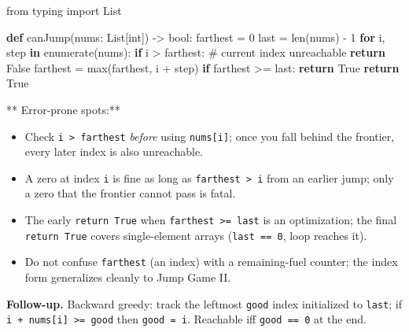 \documentclass[11pt]{article}
\providecommand{\tightlist}{\setlength{\itemsep}{1pt}\setlength{\parskip}{0pt}}
\newenvironment{Shaded}{\begin{snugshade}}{\end{snugshade}}
\newcommand{\BuiltInTok}[1]{\textcolor[rgb]{0.50,0.55,0.55}{#1}}
\newcommand{\CommentTok}[1]{\textcolor[rgb]{0.48,0.49,0.49}{#1}}
\newcommand{\ControlFlowTok}[1]{\textcolor[rgb]{0.99,0.74,0.29}{\textbf{#1}}}
\newcommand{\DecValTok}[1]{\textcolor[rgb]{0.96,0.45,0.00}{#1}}
\newcommand{\ImportTok}[1]{\textcolor[rgb]{0.15,0.68,0.38}{#1}}
\newcommand{\KeywordTok}[1]{\textcolor[rgb]{0.81,0.81,0.76}{\textbf{#1}}}
\newcommand{\NormalTok}[1]{\textcolor[rgb]{0.81,0.81,0.76}{#1}}
\newcommand{\OperatorTok}[1]{\textcolor[rgb]{0.81,0.81,0.76}{#1}}
\newcommand{\VariableTok}[1]{\textcolor[rgb]{0.15,0.68,0.68}{#1}}
\begin{document}

\begin{Shaded}
\begin{Highlighting}[]
\ImportTok{from}\NormalTok{ typing }\ImportTok{import}\NormalTok{ List}

\KeywordTok{def}\NormalTok{ canJump(nums: List[}\BuiltInTok{int}\NormalTok{]) }\OperatorTok{{-}\textgreater{}} \BuiltInTok{bool}\NormalTok{:}
\NormalTok{    farthest }\OperatorTok{=} \DecValTok{0}
\NormalTok{    last }\OperatorTok{=} \BuiltInTok{len}\NormalTok{(nums) }\OperatorTok{{-}} \DecValTok{1}
    \ControlFlowTok{for}\NormalTok{ i, step }\KeywordTok{in} \BuiltInTok{enumerate}\NormalTok{(nums):}
        \ControlFlowTok{if}\NormalTok{ i }\OperatorTok{\textgreater{}}\NormalTok{ farthest:                     }\CommentTok{\# current index unreachable}
            \ControlFlowTok{return} \VariableTok{False}
\NormalTok{        farthest }\OperatorTok{=} \BuiltInTok{max}\NormalTok{(farthest, i }\OperatorTok{+}\NormalTok{ step)}
        \ControlFlowTok{if}\NormalTok{ farthest }\OperatorTok{\textgreater{}=}\NormalTok{ last:}
            \ControlFlowTok{return} \VariableTok{True}
    \ControlFlowTok{return} \VariableTok{True}
\end{Highlighting}
\end{Shaded}

** Error-prone spots:**

\begin{itemize}
\tightlist
\item
  Check \texttt{i\ \textgreater{}\ farthest} \emph{before} using \texttt{nums{[}i{]}}; once you fall behind the frontier, every later index is also unreachable.
\item
  A zero at index \texttt{i} is fine as long as \texttt{farthest\ \textgreater{}\ i} from an earlier jump; only a zero that the frontier cannot pass is fatal.
\item
  The early \texttt{return\ True} when \texttt{farthest\ \textgreater{}=\ last} is an optimization; the final \texttt{return\ True} covers single-element arrays (\texttt{last\ ==\ 0}, loop reaches it).
\item
  Do not confuse \texttt{farthest} (an index) with a remaining-fuel counter; the index form generalizes cleanly to Jump Game II.
\end{itemize}

\textbf{Follow-up.} Backward greedy: track the leftmost \texttt{good} index initialized to \texttt{last}; if \texttt{i\ +\ nums{[}i{]}\ \textgreater{}=\ good} then \texttt{good\ =\ i}. Reachable iff \texttt{good\ ==\ 0} at the end.
\end{document}
